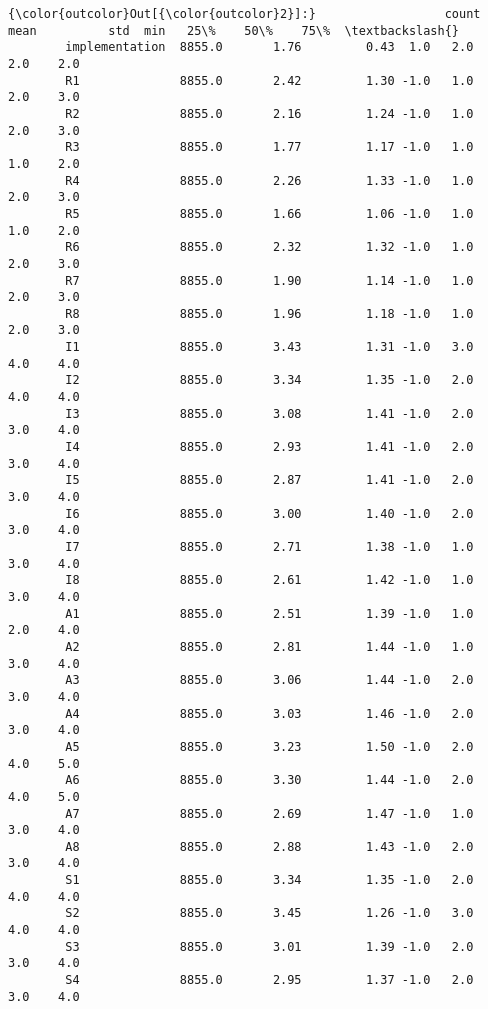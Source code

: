 \documentclass[11pt]{article}
\begin{document}
            \begin{Verbatim}[commandchars=\\\{\}]
{\color{outcolor}Out[{\color{outcolor}2}]:}                  count       mean          std  min   25\%    50\%    75\%  \textbackslash{}
        implementation  8855.0       1.76         0.43  1.0   2.0    2.0    2.0   
        R1              8855.0       2.42         1.30 -1.0   1.0    2.0    3.0   
        R2              8855.0       2.16         1.24 -1.0   1.0    2.0    3.0   
        R3              8855.0       1.77         1.17 -1.0   1.0    1.0    2.0   
        R4              8855.0       2.26         1.33 -1.0   1.0    2.0    3.0   
        R5              8855.0       1.66         1.06 -1.0   1.0    1.0    2.0   
        R6              8855.0       2.32         1.32 -1.0   1.0    2.0    3.0   
        R7              8855.0       1.90         1.14 -1.0   1.0    2.0    3.0   
        R8              8855.0       1.96         1.18 -1.0   1.0    2.0    3.0   
        I1              8855.0       3.43         1.31 -1.0   3.0    4.0    4.0   
        I2              8855.0       3.34         1.35 -1.0   2.0    4.0    4.0   
        I3              8855.0       3.08         1.41 -1.0   2.0    3.0    4.0   
        I4              8855.0       2.93         1.41 -1.0   2.0    3.0    4.0   
        I5              8855.0       2.87         1.41 -1.0   2.0    3.0    4.0   
        I6              8855.0       3.00         1.40 -1.0   2.0    3.0    4.0   
        I7              8855.0       2.71         1.38 -1.0   1.0    3.0    4.0   
        I8              8855.0       2.61         1.42 -1.0   1.0    3.0    4.0   
        A1              8855.0       2.51         1.39 -1.0   1.0    2.0    4.0   
        A2              8855.0       2.81         1.44 -1.0   1.0    3.0    4.0   
        A3              8855.0       3.06         1.44 -1.0   2.0    3.0    4.0   
        A4              8855.0       3.03         1.46 -1.0   2.0    3.0    4.0   
        A5              8855.0       3.23         1.50 -1.0   2.0    4.0    5.0   
        A6              8855.0       3.30         1.44 -1.0   2.0    4.0    5.0   
        A7              8855.0       2.69         1.47 -1.0   1.0    3.0    4.0   
        A8              8855.0       2.88         1.43 -1.0   2.0    3.0    4.0   
        S1              8855.0       3.34         1.35 -1.0   2.0    4.0    4.0   
        S2              8855.0       3.45         1.26 -1.0   3.0    4.0    4.0   
        S3              8855.0       3.01         1.39 -1.0   2.0    3.0    4.0   
        S4              8855.0       2.95         1.37 -1.0   2.0    3.0    4.0   

\end{Verbatim}
\end{document}
